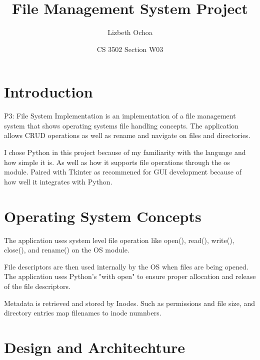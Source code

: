 \documentclass[12pt]{article}
\title{File Management System Project}
\author{Lizbeth Ochoa}
\date{CS 3502 Section W03}
\begin{document}
\maketitle

\section{Introduction}
P3: File System Implementation is an implementation of a file management system that shows operating systems file handling concepts. The application allows CRUD operations as well as rename and navigate on files and directories.

I chose Python in this project because of my familiarity with the language and how simple it is. As well as how it supports file operations through the os module. Paired with Tkinter as recommened for GUI development because of how well it integrates with Python.

\section{Operating System Concepts}
The application uses system level file operation like open(), read(), write(), close(), and rename() on the OS module.

File descriptors are then used internally by the OS when files are being opened. The application uses Python's "with open" to ensure proper allocation and release of the file descriptors.

Metadata is retrieved and stored by Inodes. Such as permissions and file size, and directory entries map filenames to inode numnbers.

\section{Design and Architechture}

\begin{center}
\end{center}
\end{document}
